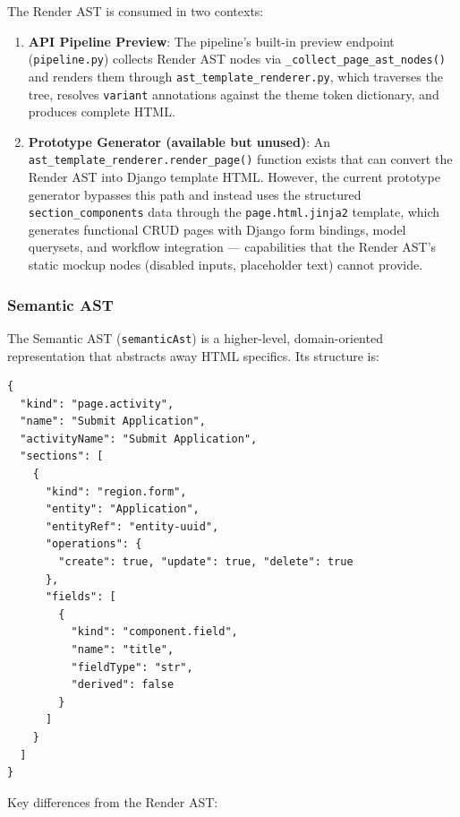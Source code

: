 The Render AST is consumed in two contexts:
\begin{enumerate}
    \item \textbf{API Pipeline Preview}: The pipeline's built-in preview endpoint (\texttt{pipeline.py}) collects Render AST nodes via \texttt{\_collect\_page\_ast\_nodes()} and renders them through \texttt{ast\_template\_renderer.py}, which traverses the tree, resolves \texttt{variant} annotations against the theme token dictionary, and produces complete HTML.
    \item \textbf{Prototype Generator (available but unused)}: An \texttt{ast\_template\_renderer.render\_page()} function exists that can convert the Render AST into Django template HTML. However, the current prototype generator bypasses this path and instead uses the structured \texttt{section\_components} data through the \texttt{page.html.jinja2} template, which generates functional CRUD pages with Django form bindings, model querysets, and workflow integration — capabilities that the Render AST's static mockup nodes (disabled inputs, placeholder text) cannot provide.
\end{enumerate}

\subsubsection{Semantic AST}

The Semantic AST (\texttt{semanticAst}) is a higher-level, domain-oriented representation that abstracts away HTML specifics. Its structure is:

\begin{verbatim}
{
  "kind": "page.activity",
  "name": "Submit Application",
  "activityName": "Submit Application",
  "sections": [
    {
      "kind": "region.form",
      "entity": "Application",
      "entityRef": "entity-uuid",
      "operations": {
        "create": true, "update": true, "delete": true
      },
      "fields": [
        {
          "kind": "component.field",
          "name": "title",
          "fieldType": "str",
          "derived": false
        }
      ]
    }
  ]
}
\end{verbatim}

Key differences from the Render AST:

